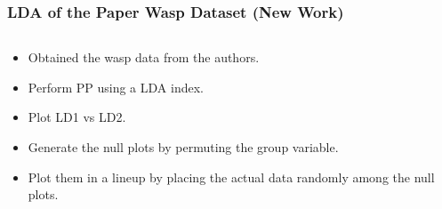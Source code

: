 \documentclass{beamer}
\begin{document}
\begin{frame}
	\frametitle{LDA of the Paper Wasp Dataset (New Work)}
	\begin{columns}
		\begin{column}{0.4\textwidth}
		  \begin{itemize}
		  	\item Obtained the wasp data from the authors. 
			  \item Perform PP using a LDA index.
			\item Plot LD1 vs LD2.
			 \item Generate the null plots by permuting the group variable. 
			 \item Plot them in a lineup by placing the actual data randomly among the null plots.
 
		  \end{itemize}		
			
		\end{column}
		
		\begin{column}{0.6\textwidth}
			 \begin{center}  \end{center}
		\end{column}
	\end{columns}  

\end{frame}
\end{document}
